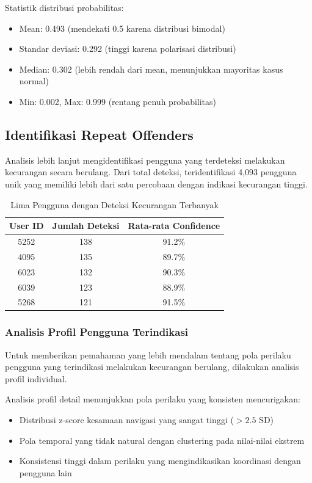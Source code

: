 Statistik distribusi probabilitas:
\begin{itemize}
    \item Mean: 0.493 (mendekati 0.5 karena distribusi bimodal)
    \item Standar deviasi: 0.292 (tinggi karena polarisasi distribusi)
    \item Median: 0.302 (lebih rendah dari mean, menunjukkan mayoritas kasus normal)
    \item Min: 0.002, Max: 0.999 (rentang penuh probabilitas)
\end{itemize}

\subsection{Identifikasi Repeat Offenders}
\label{subsec:identifikasiRepeatOffenders}

Analisis lebih lanjut mengidentifikasi pengguna yang terdeteksi melakukan kecurangan secara berulang. Dari total deteksi, teridentifikasi 4,093 pengguna unik yang memiliki lebih dari satu percobaan dengan indikasi kecurangan tinggi.

\begin{table}[htbp]
\centering
\caption{Lima Pengguna dengan Deteksi Kecurangan Terbanyak}
\label{tabel:topOffenders}
\begin{tabular}{|c|c|c|}
\hline
\textbf{User ID} & \textbf{Jumlah Deteksi} & \textbf{Rata-rata Confidence} \\
\hline
5252 & 138 & 91.2\% \\
\hline
4095 & 135 & 89.7\% \\
\hline
6023 & 132 & 90.3\% \\
\hline
6039 & 123 & 88.9\% \\
\hline
5268 & 121 & 91.5\% \\
\hline
\end{tabular}
\end{table}

\subsubsection{Analisis Profil Pengguna Terindikasi}

Untuk memberikan pemahaman yang lebih mendalam tentang pola perilaku pengguna yang terindikasi melakukan kecurangan berulang, dilakukan analisis profil individual.

Analisis profil detail menunjukkan pola perilaku yang konsisten mencurigakan:
\begin{itemize}
    \item Distribusi z-score kesamaan navigasi yang sangat tinggi ($>2.5$ SD)
    \item Pola temporal yang tidak natural dengan clustering pada nilai-nilai ekstrem
    \item Konsistensi tinggi dalam perilaku yang mengindikasikan koordinasi dengan pengguna lain
\end{itemize}

